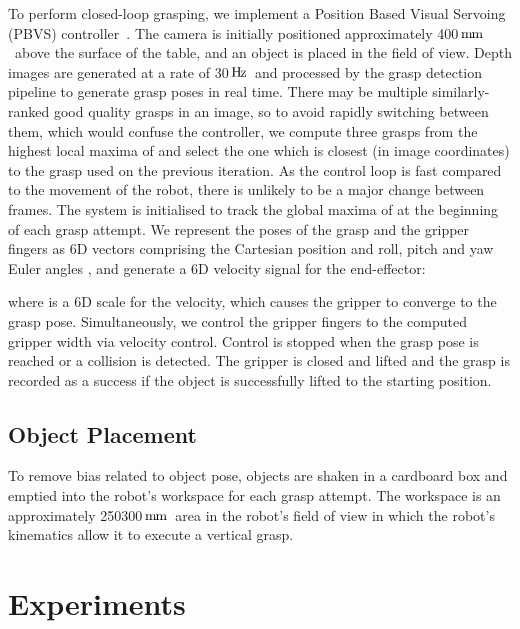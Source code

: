 \documentclass[conference]{IEEEtran}
\newcommand{\pack}	{\hspace{-0.08em}}
\newcommand{\Hz}	{\ensuremath{\rm\,H\pack z}}
\newcommand{\mm}	{\ensuremath{\rm\,m\pack m}}
\begin{document}
To perform closed-loop grasping, we implement a Position Based Visual Servoing (PBVS) controller~\cite{kragic2002survey}.  The camera is initially positioned approximately 400\mm~above the surface of the table, and an object is placed in the field of view.  Depth images are generated at a rate of 30\Hz~and processed by the grasp detection pipeline to generate grasp poses in real time.  There may be multiple similarly-ranked good quality grasps in an image, so to avoid rapidly switching between them, which would confuse the controller, we compute three grasps from the highest local maxima of  and select the one which is closest (in image coordinates) to the grasp  used on the previous iteration.  As the control loop is fast compared to the movement of the robot, there is unlikely to be a major change between frames.  The system is initialised to track the global maxima of  at the beginning of each grasp attempt.  We represent the poses of the grasp  and the gripper fingers  as 6D vectors comprising the Cartesian position and roll, pitch and yaw Euler angles , and generate a 6D velocity signal for the end-effector:


where  is a 6D scale for the velocity, which causes the gripper to converge to the grasp pose.  Simultaneously, we control the gripper fingers to the computed gripper width via velocity control.  Control is stopped when the grasp pose is reached or a collision is detected.  The gripper is closed and lifted and the grasp is recorded as a success if the object is successfully lifted to the starting position.

\subsection{Object Placement}

To remove bias related to object pose, objects are shaken in a cardboard box and emptied into the robot's workspace for each grasp attempt.  The workspace is an approximately 250300\mm~area in the robot's field of view in which the robot's kinematics allow it to execute a vertical grasp.


\section{Experiments}
\end{document}
